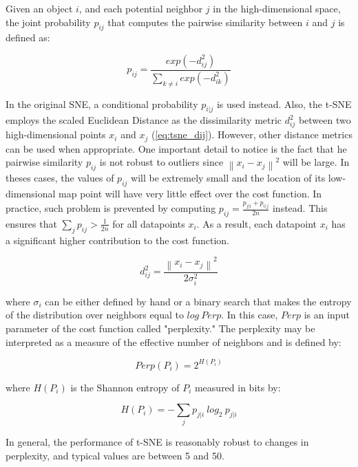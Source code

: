 Given an object $i$, and each potential neighbor $j$ in the high-dimensional space, the joint probability $p_{ij}$ that computes the pairwise similarity between $i$ and $j$ is defined as:

\begin{equation}
\label{eq:tsne_pij}
p_{ij} = \frac{exp(-d_{ij}^2)}{\sum_{k \neq i}exp(-d_{ik}^2)}
\end{equation}

In the original SNE, a conditional probability $p_{i|j}$ is used instead. Also, the t-SNE employs the scaled Euclidean Distance as the dissimilarity metric $d_{ij}^2$ between two high-dimensional points $x_i$ and $x_j$ (\autoref{eq:tsne_dij}). However, other distance metrics can be used when appropriate. One important detail to notice is the fact that he pairwise similarity $p_{ij}$ is not robust to outliers since $\left\| x_i - x_j\right\|^2$ will be large. In theses cases, the values of $p_{ij}$ will be extremely small and the location of its low-dimensional map point will have very little effect over the cost function. In practice, such problem is prevented by computing $p_{ij} = \frac{p_{j|i} + p_{i|j}}{2n}$ instead. This ensures that $\sum_j p_{ij} > \frac{1}{2n}$ for all datapoints $x_i$. As a result, each datapoint $x_i$ has a significant higher contribution to the cost function.

\begin{equation}
\label{eq:tsne_dij}
d_{ij}^2 = \frac{\left\| x_i - x_j \right\|^2}{2\sigma_i^2}
\end{equation}

\noindent
where $\sigma_i$ can be either defined by hand or a binary search that makes the entropy of the distribution over neighbors equal to $log\ Perp$. In this case, $Perp$ is an input parameter of the cost function called "perplexity." The perplexity may be interpreted as a measure of the effective number of neighbors and is defined by:

\begin{equation}
\label{eq:tsne_perp}
Perp(P_i) = 2^{H(P_i)}
\end{equation}

\noindent
where $H(P_i)$ is the Shannon entropy of $P_i$ measured in bits by:

\begin{equation}
\label{eq:tsne_entropy}
H(P_i) = -\sum_j p_{j|i}\ log_2\ p_{j|i}
\end{equation}

In general, the performance of t-SNE is reasonably robust to changes in perplexity, and typical values are between 5 and 50.

